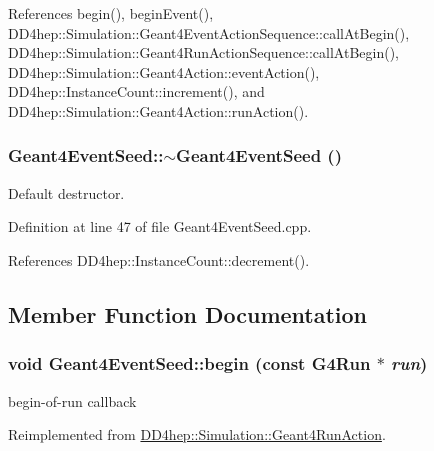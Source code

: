 References begin(), beginEvent(), DD4hep::Simulation::Geant4EventActionSequence::callAtBegin(), DD4hep::Simulation::Geant4RunActionSequence::callAtBegin(), DD4hep::Simulation::Geant4Action::eventAction(), DD4hep::InstanceCount::increment(), and DD4hep::Simulation::Geant4Action::runAction().\hypertarget{class_d_d4hep_1_1_simulation_1_1_geant4_event_seed_aa5a136f12e95432a45ca2eef0c1b6856}{
\subsubsection[{$\sim$Geant4EventSeed}]{\setlength{\rightskip}{0pt plus 5cm}Geant4EventSeed::$\sim$Geant4EventSeed ()}}
\label{class_d_d4hep_1_1_simulation_1_1_geant4_event_seed_aa5a136f12e95432a45ca2eef0c1b6856}


Default destructor. 

Definition at line 47 of file Geant4EventSeed.cpp.

References DD4hep::InstanceCount::decrement().

\subsection{Member Function Documentation}
\hypertarget{class_d_d4hep_1_1_simulation_1_1_geant4_event_seed_a297ed6d4c7366df16c151f31bee46028}{
\subsubsection[{begin}]{\setlength{\rightskip}{0pt plus 5cm}void Geant4EventSeed::begin (const G4Run $\ast$ {\em run})}}
\label{class_d_d4hep_1_1_simulation_1_1_geant4_event_seed_a297ed6d4c7366df16c151f31bee46028}


begin-\/of-\/run callback 

Reimplemented from \hyperlink{class_d_d4hep_1_1_simulation_1_1_geant4_run_action_aeea4684e5d27e039b26734c3dbf3f65b}{DD4hep::Simulation::Geant4RunAction}.

